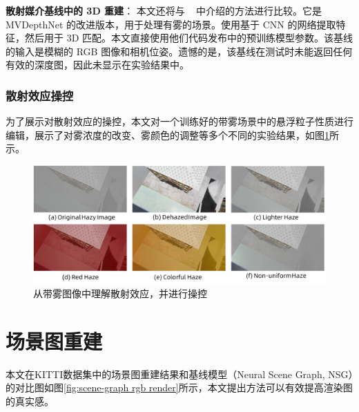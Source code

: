 \noindent\textbf{散射媒介基线中的 3D 重建}：
本文还将与 ~\cite{fujimura_dehazing_2021} 中介绍的方法进行比较。它是 MVDepthNet 的改进版本，用于处理有雾的场景。使用基于 CNN 的网络提取特征，然后用于 3D 匹配。本文直接使用他们代码发布中的预训练模型参数。该基线的输入是模糊的 RGB 图像和相机位姿。遗憾的是，该基线在测试时未能返回任何有效的深度图，因此未显示在实验结果中。



\subsubsection{散射效应操控}
为了展示对散射效应的操控，本文对一个训练好的带雾场景中的悬浮粒子性质进行编辑，展示了对雾浓度的改变、雾颜色的调整等多个不同的实验结果，如图\ref{fig:dehazenerf-manipulation}所示。

\begin{figure}[ht]
    \centering
    \includegraphics[width=\textwidth]{undergraduate-thesis/images/experiments/haze-manipulation.pdf}
    \caption{从带雾图像中理解散射效应，并进行操控}
    \label{fig:dehazenerf-manipulation}
\end{figure}

\newpage
\section{场景图重建}
本文在KITTI数据集中的场景图重建结果和基线模型（Neural Scene Graph, NSG\cite{ost_neural_2021}）的对比图如图\ref{fig:scene-graph rgb render}所示，本文提出方法可以有效提高渲染图的真实感。

\begin{table}[ht]
\centering
{}
\caption{场景图模型的数值对比结果}
\label{tab:scene-graphs}
\end{table}

